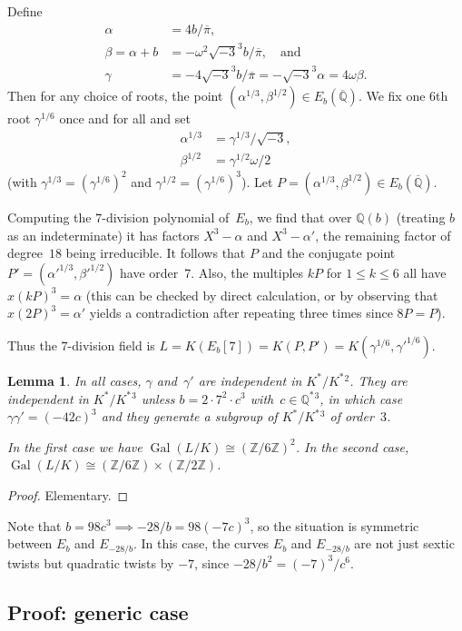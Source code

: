 \documentclass[12pt]{amsart}
\newcommand{\Q}{\mathbb{Q}}
\newcommand{\Z}{\mathbb{Z}}
\newcommand{\Qbar}{{\overline{\Q}}}
\DeclareMathOperator{\Gal}{Gal}
\def\w{\omega}
\def\r3{\sqrt{-3}}
\def\pibar{\overline{\pi}}
\numberwithin{equation}{section}
\newtheorem{lemma}[theorem]{Lemma}
\theoremstyle{definition}
\theoremstyle{remark}
\begin{document}
Define
\begin{align}
\alpha&=4b/\pibar,\\
\beta=\alpha+b&=-\w^2\r3^3b/\pibar,\quad\text{and}\\
\gamma&=-4\r3^3b/\pibar = -\r3^3\alpha = 4\w\beta.
\end{align}
Then for any choice of roots, the point $(\alpha^{1/3},\beta^{1/2})\in
E_b(\Qbar)$.  We fix one $6$th root $\gamma^{1/6}$ once and for all
and set
\begin{align}
\alpha^{1/3} &= \gamma^{1/3}/\r3,\\
\beta^{1/2} &= \gamma^{1/2}\w/2
\end{align}
(with $\gamma^{1/3}=(\gamma^{1/6})^2$ and $\gamma^{1/2}=(\gamma^{1/6})^3$).  Let
$P=(\alpha^{1/3},\beta^{1/2})\in E_b(\Qbar)$.

Computing the $7$-division polynomial of~$E_b$, we find that over
$\Q(b)$ (treating $b$ as an indeterminate) it has factors $X^3-\alpha$
and $X^3-\alpha'$, the remaining factor of degree~$18$ being
irreducible.  It follows that $P$ and the conjugate point
$P'=(\alpha'^{1/3},\beta'^{1/2})$ have order~$7$.  Also, the multiples
$kP$ for $1\le k\le6$ all have $x(kP)^3=\alpha$ (this can be checked
by direct calculation, or by observing that $x(2P)^3=\alpha'$ yields a
contradiction after repeating three times since $8P=P$).

Thus the $7$-division field is
$L=K(E_b[7])=K(P,P')=K(\gamma^{1/6},\gamma'^{1/6})$.

\begin{lemma}In all cases, $\gamma$ and~$\gamma'$ are independent in
  $K^*/K^*{}^2$.  They are independent in $K^*/K^*{}^3$ unless
  $b=2\cdot7^2\cdot c^3$ with~$c\in\Q^*{}^3$, in which case
  $\gamma\gamma'=(-42c)^3$ and they generate a subgroup of $K^*/K^*{}^3$
  of order~$3$.

In the first case we have $\Gal(L/K)\cong(\Z/6\Z)^2$.  In the second
case, $\Gal(L/K)\cong(\Z/6\Z)\times(\Z/2\Z)$.
\end{lemma}
\begin{proof}
Elementary.
\end{proof}
Note that $b=98c^3\implies -28/b=98(-7c)^3$, so the situation is
symmetric between $E_b$ and $E_{-28/b}$.  In this case, the curves
$E_b$ and $E_{-28/b}$ are not just sextic twists but quadratic twists
by $-7$, since $-28/b^2=(-7)^3/c^6$.

\subsection{Proof: generic case}
\end{document}
